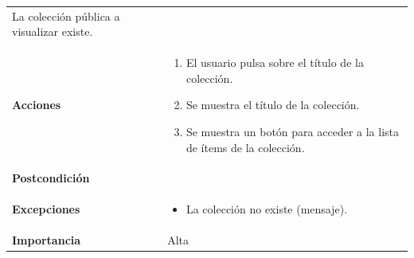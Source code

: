 \documentclass[
]{article}
\providecommand{\tightlist}{%
  \setlength{\itemsep}{0pt}\setlength{\parskip}{0pt}}
\begin{document}
\begin{longtable}[]{@{}ll@{}}
\begin{minipage}[t]{0.69\columnwidth}
La colección pública a visualizar existe.\strut
\end{minipage}\tabularnewline
\begin{minipage}[t]{0.25\columnwidth}\raggedright
\textbf{Acciones}\strut
\end{minipage} & \begin{minipage}[t]{0.69\columnwidth}\raggedright
\begin{enumerate}
\def\labelenumi{\arabic{enumi}.}
\tightlist
\item
  El usuario pulsa sobre el título de la colección.
\item
  Se muestra el título de la colección.
\item
  Se muestra un botón para acceder a la lista de ítems de la colección.
\end{enumerate}\strut
\end{minipage}\tabularnewline
\begin{minipage}[t]{0.25\columnwidth}\raggedright
\textbf{Postcondición}\strut
\end{minipage} & \begin{minipage}[t]{0.69\columnwidth}\raggedright
\strut
\end{minipage}\tabularnewline
\begin{minipage}[t]{0.25\columnwidth}\raggedright
\textbf{Excepciones}\strut
\end{minipage} & \begin{minipage}[t]{0.69\columnwidth}\raggedright
\begin{itemize}
\tightlist
\item
  La colección no existe (mensaje).
\end{itemize}\strut
\end{minipage}\tabularnewline
\begin{minipage}[t]{0.25\columnwidth}\raggedright
\textbf{Importancia}\strut
\end{minipage} & \begin{minipage}[t]{0.69\columnwidth}\raggedright
Alta\strut
\end{minipage}\tabularnewline
\bottomrule
\end{longtable}
\end{document}
